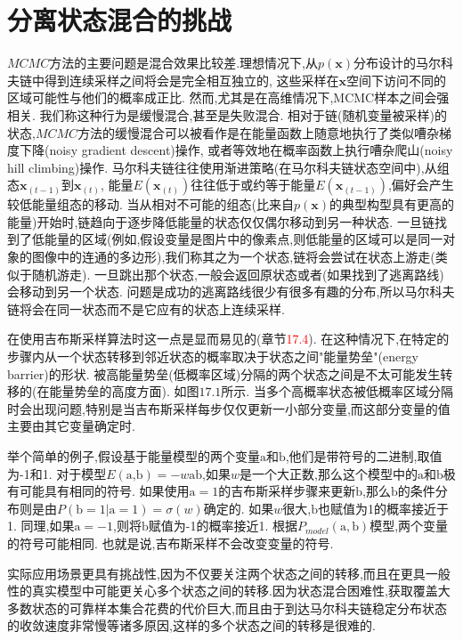 \section{分离状态混合的挑战}
\label{sec:17.5}

$MCMC$方法的主要问题是混合效果比较差.理想情况下,从$p(\bm{x})$分布设计的马尔科夫链中得到连续采样之间将会是完全相互独立的,
这些采样在$\bm{x}$空间下访问不同的区域可能性与他们的概率成正比.
然而,尤其是在高维情况下,MCMC样本之间会强相关.
我们称这种行为是缓慢混合,甚至是失败混合.
相对于链(随机变量被采样)的状态,$MCMC$方法的缓慢混合可以被看作是在能量函数上随意地执行了类似嘈杂梯度下降(noisy gradient descent)操作,
或者等效地在概率函数上执行嘈杂爬山(noisy hill climbing)操作.
马尔科夫链往往使用渐进策略(在马尔科夫链状态空间中),从组态$\bm{x}_{(t-1)}$到$\bm{x}_{(t)}$,
能量$E(\bm{x}_{(t)})$往往低于或约等于能量$E(\bm{x}_{(t-1)})$,偏好会产生较低能量组态的移动.
当从相对不可能的组态(比来自$p(\textbf{x})$的典型构型具有更高的能量)开始时,链趋向于逐步降低能量的状态仅仅偶尔移动到另一种状态.
一旦链找到了低能量的区域(例如,假设变量是图片中的像素点,则低能量的区域可以是同一对象的图像中的连通的多边形),我们称其之为一个状态,链将会尝试在状态上游走(类似于随机游走).
一旦跳出那个状态,一般会返回原状态或者(如果找到了逃离路线)会移动到另一个状态.
问题是成功的逃离路线很少有很多有趣的分布,所以马尔科夫链将会在同一状态而不是它应有的状态上连续采样.

在使用吉布斯采样算法时这一点是显而易见的(章节\textcolor{red}{17.4}).
在这种情况下,在特定的步骤内从一个状态转移到邻近状态的概率取决于状态之间"能量势垒"(energy barrier)的形状.
被高能量势垒(低概率区域)分隔的两个状态之间是不太可能发生转移的(在能量势垒的高度方面).
如图$17.1$所示.
当多个高概率状态被低概率区域分隔时会出现问题,特别是当吉布斯采样每步仅仅更新一小部分变量,而这部分变量的值主要由其它变量确定时.

举个简单的例子,假设基于能量模型的两个变量$\text{a}$和$\text{b}$,他们是带符号的二进制,取值为-1和1.
对于模型$E(\text{a,b})=-w\text{ab}$,如果$w$是一个大正数,那么这个模型中的$\text{a}$和$\text{b}$极有可能具有相同的符号.
如果使用$\text{a}=1$的吉布斯采样步骤来更新$\text{b}$,那么$\text{b}$的条件分布则是由$P(\text{b}=1|\text{a}=1)=\sigma(w)$确定的.
如果$w$很大,$\text{b}$也赋值为1的概率接近于1.
同理,如果$\text{a}=-1$,则将$\text{b}$赋值为-1的概率接近1.
根据$P_{model}(\text{a},\text{b})$模型,两个变量的符号可能相同.
也就是说,吉布斯采样不会改变变量的符号.

实际应用场景更具有挑战性,因为不仅要关注两个状态之间的转移,而且在更具一般性的真实模型中可能更关心多个状态之间的转移.因为状态混合困难性,获取覆盖大多数状态的可靠样本集合花费的代价巨大,而且由于到达马尔科夫链稳定分布状态的收敛速度非常慢等诸多原因,这样的多个状态之间的转移是很难的.

